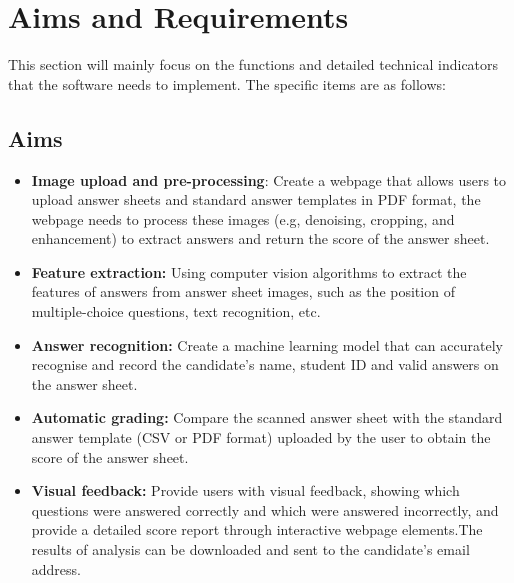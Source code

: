 \documentclass[twocolumn]{article}
\begin{document}
\section{Aims and Requirements}
This section will mainly focus on the functions and detailed technical indicators that the software needs to implement. The specific items are as follows: 
    \subsection{Aims}
    \begin{itemize}
    \item \textbf{Image upload and pre-processing}: Create a webpage that allows users to upload answer sheets and standard answer templates in PDF format, the webpage needs to process these images (e.g, denoising, cropping, and enhancement) to extract answers and return the score of the answer sheet.
    \item \textbf{Feature extraction:} Using computer vision algorithms to extract the features of answers from answer sheet images, such as the position of multiple-choice questions, text recognition, etc.
    \item \textbf{Answer recognition:} Create a machine learning model that can accurately recognise and record the candidate's name, student ID and valid answers on the answer sheet.
    \item \textbf{Automatic grading:} Compare the scanned answer sheet with the standard answer template (CSV or PDF format) uploaded by the user to obtain the score of the answer sheet.
    \item \textbf{Visual feedback:} Provide users with visual feedback, showing which questions were answered correctly and which were answered incorrectly, and provide a detailed score report through interactive webpage elements.The results of analysis can be downloaded and sent to the candidate's email address.
    \end{itemize}
\end{document}
